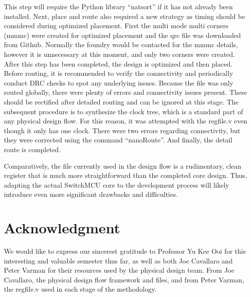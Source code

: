 \documentclass[conference]{IEEEtran}
\begin{document}
This step will require the Python library “natsort” if it has not already been installed. Next, place and route also required a new strategy as timing should be considered during optimized placement. First the multi mode multi corners (mmmc) were created for optimized placement and the qrc file was downloaded from Github. Normally the foundry would be contacted for the mmmc details, however it is unnecessary at this moment, and only two corners were created. After this step has been completed, the design is optimized and then placed. Before routing, it is recommended to verify the connectivity and periodically conduct DRC checks to spot any underlying issues. Because the file was only routed globally, there were plenty of  errors and connectivity issues present. These should be rectified after detailed routing and can be ignored at this stage. The subsequent procedure is to synthesize the clock tree, which is a standard part of any physical design flow. For this reason, it was attempted with the regfile.v even though it only has one clock. There were two errors regarding connectivity, but they were corrected using the command “nanoRoute”. And finally, the detail route is completed.

Comparatively, the file currently used in the design flow is a rudimentary, clean register that is much more straightforward than the completed core design. Thus, adapting the actual SwitchMCU core to the development process will likely introduce even more significant drawbacks and difficulties.


\section*{Acknowledgment}

We would like to express our sincerest gratitude to Professor Yu Kee Ooi for this interesting and valuable semester thus far, as well as both Joe Cavallaro and Peter Varman for their resources used by the physical design team. From Joe Cavallaro, the physical design flow framework and files, and from Peter Varman, the regfile.v used in each stage of the methodology. 
\end{document}
